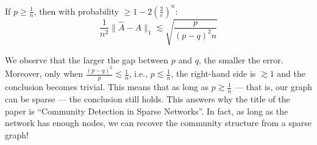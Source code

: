 \begin{thm}
\label{thm:sbm}
If $p \geq \frac{1}{n}$, then with probability $\geq 1 - 2\left(\frac{2}{e}\right)^n$:
\begin{equation*}
\label{eq:30}
\frac{1}{n^2}\|\hat{A} - A\|_1 \lesssim \sqrt{\frac{p}{(p-q)^2 n}}
\end{equation*}
\end{thm}

\begin{rem}
We observe that the larger the gap between $p$ and $q$, the smaller the error. Moreover, only when $\frac{(p-q)^2}{p} \lesssim \frac{1}{n}$, i.e., $p \lesssim \frac{1}{n}$, the right-hand side is $\gtrsim 1$ and the conclusion becomes trivial. This means that as long as $p \gtrsim \frac{1}{n}$ — that is, our graph can be sparse — the conclusion still holds. This answers why the title of the paper is ``Community Detection in Sparse Networks''. In fact, as long as the network has enough nodes, we can recover the community structure from a sparse graph!
\end{rem}

